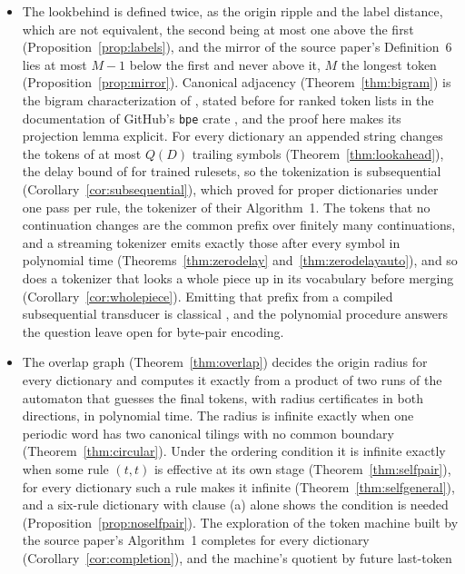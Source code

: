 \documentclass[11pt,a4paper]{article}
\theoremstyle{definition}
\theoremstyle{plain}
\newcommand{\code}[1]{\texttt{#1}}
\begin{document}
\begin{itemize}
\item The lookbehind is defined twice, as the origin ripple and the label distance, which are not equivalent, the second
being at most one above the first (Proposition~\ref{prop:labels}), and the mirror of the source paper's Definition~6
lies at most \(M - 1\) below the first and never above it, \(M\) the longest token (Proposition~\ref{prop:mirror}).
Canonical adjacency (Theorem~\ref{thm:bigram}) is the bigram characterization of \citet{vieira2025canonical}, stated
before for ranked token lists in the documentation of GitHub's \code{bpe} crate \citep{vanantwerpen2024bpe}, and the
proof here makes its projection lemma explicit. For every dictionary an appended string changes the tokens of at most
\(Q(D)\) trailing symbols (Theorem~\ref{thm:lookahead}), the delay bound of \citet{mamouras2026bpe} for trained
rulesets, so the tokenization is subsequential (Corollary~\ref{cor:subsequential}), which
\citet[Theorem~4]{berglund2024dfa} proved for proper dictionaries under one pass per rule, the tokenizer of their
Algorithm~1. The tokens that no continuation changes are the common prefix over finitely many continuations, and a
streaming tokenizer emits exactly those after every symbol in polynomial time (Theorems~\ref{thm:zerodelay}
and~\ref{thm:zerodelayauto}), and so does a tokenizer that looks a whole piece up in its vocabulary before merging
(Corollary~\ref{cor:wholepiece}). Emitting that prefix from a compiled subsequential transducer is classical
\citep{mohri1994compact}, and the polynomial procedure answers the question \citet{dalirrooyfard2026online} leave open
for byte-pair encoding.
\item The overlap graph (Theorem~\ref{thm:overlap}) decides the origin radius for every dictionary and computes it
exactly from a product of two runs of the automaton that guesses the final tokens, with radius certificates in both
directions, in polynomial time. The radius is infinite exactly when one periodic word has two canonical tilings with no
common boundary (Theorem~\ref{thm:circular}). Under the ordering condition it is infinite exactly when some rule
\((t, t)\) is effective at its own stage (Theorem~\ref{thm:selfpair}), for every dictionary such a rule makes it
infinite (Theorem~\ref{thm:selfgeneral}), and a six-rule dictionary with clause (a) alone shows the condition is needed
(Proposition~\ref{prop:noselfpair}). The exploration of the token machine built by the source paper's Algorithm~1
completes for every dictionary (Corollary~\ref{cor:completion}), and the machine's quotient by future last-token

\end{itemize}
\end{document}
